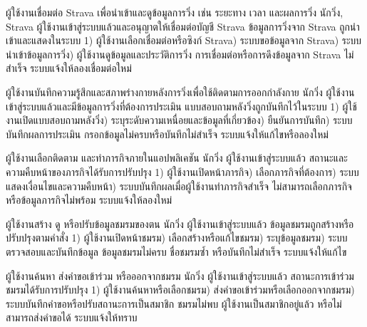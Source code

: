 {ผู้ใช้งานเชื่อมต่อ Strava เพื่อนำเข้าและดูข้อมูลการวิ่ง เช่น ระยะทาง เวลา และผลการวิ่ง}
{นักวิ่ง, Strava}
{ผู้ใช้งานเข้าสู่ระบบแล้วและอนุญาตให้เชื่อมต่อบัญชี Strava}
{ข้อมูลการวิ่งจาก Strava ถูกนำเข้าและแสดงในระบบ}
{1) ผู้ใช้งานเลือกเชื่อมต่อหรือซิงก์ Strava) ระบบขอข้อมูลจาก Strava) ระบบนำเข้าข้อมูลการวิ่ง) ผู้ใช้งานดูข้อมูลและประวัติการวิ่ง}
{การเชื่อมต่อหรือการดึงข้อมูลจาก Strava ไม่สำเร็จ ระบบแจ้งให้ลองเชื่อมต่อใหม่}

{ผู้ใช้งานบันทึกความรู้สึกและสภาพร่างกายหลังการวิ่งเพื่อใช้ติดตามการออกกำลังกาย}
{นักวิ่ง}
{ผู้ใช้งานเข้าสู่ระบบแล้วและมีข้อมูลการวิ่งที่ต้องการประเมิน}
{แบบสอบถามหลังวิ่งถูกบันทึกไว้ในระบบ}
{1) ผู้ใช้งานเปิดแบบสอบถามหลังวิ่ง) ระบุระดับความเหนื่อยและข้อมูลที่เกี่ยวข้อง) ยืนยันการบันทึก) ระบบบันทึกผลการประเมิน}
{กรอกข้อมูลไม่ครบหรือบันทึกไม่สำเร็จ ระบบแจ้งให้แก้ไขหรือลองใหม่}

{ผู้ใช้งานเลือกติดตาม และทำภารกิจภายในแอปพลิเคชัน}
{นักวิ่ง}
{ผู้ใช้งานเข้าสู่ระบบแล้ว}
{สถานะและความคืบหน้าของภารกิจได้รับการปรับปรุง}
{1) ผู้ใช้งานเปิดหน้าภารกิจ) เลือกภารกิจที่ต้องการ) ระบบแสดงเงื่อนไขและความคืบหน้า) ระบบบันทึกผลเมื่อผู้ใช้งานทำภารกิจสำเร็จ}
{ไม่สามารถเลือกภารกิจหรือข้อมูลภารกิจไม่พร้อม ระบบแจ้งให้ลองใหม่}

{ผู้ใช้งานสร้าง ดู หรือปรับข้อมูลชมรมของตน}
{นักวิ่ง}
{ผู้ใช้งานเข้าสู่ระบบแล้ว}
{ข้อมูลชมรมถูกสร้างหรือปรับปรุงตามคำสั่ง}
{1) ผู้ใช้งานเปิดหน้าชมรม) เลือกสร้างหรือแก้ไขชมรม) ระบุข้อมูลชมรม) ระบบตรวจสอบและบันทึกข้อมูล}
{ข้อมูลชมรมไม่ครบ ชื่อชมรมซ้ำ หรือบันทึกไม่สำเร็จ ระบบแจ้งให้แก้ไข}

{ผู้ใช้งานค้นหา ส่งคำขอเข้าร่วม หรือออกจากชมรม}
{นักวิ่ง}
{ผู้ใช้งานเข้าสู่ระบบแล้ว}
{สถานะการเข้าร่วมชมรมได้รับการปรับปรุง}
{1) ผู้ใช้งานค้นหาหรือเลือกชมรม) ส่งคำขอเข้าร่วมหรือเลือกออกจากชมรม) ระบบบันทึกคำขอหรือปรับสถานะการเป็นสมาชิก}
{ชมรมไม่พบ ผู้ใช้งานเป็นสมาชิกอยู่แล้ว หรือไม่สามารถส่งคำขอได้ ระบบแจ้งให้ทราบ}

